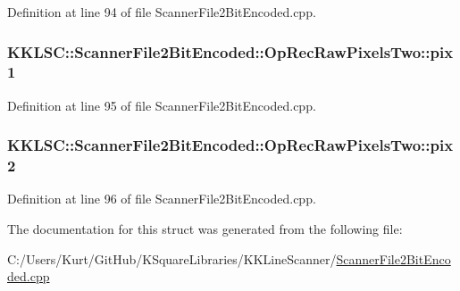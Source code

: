 Definition at line 94 of file Scanner\+File2\+Bit\+Encoded.\+cpp.

\subsubsection[{\texorpdfstring{pix1}{pix1}}]{ K\+K\+L\+S\+C\+::\+Scanner\+File2\+Bit\+Encoded\+::\+Op\+Rec\+Raw\+Pixels\+Two\+::pix1}\hypertarget{struct_scanner_file2_bit_encoded_1_1_op_rec_raw_pixels_two_a7f94fe7299b496e66520797259a9269a}{}\label{struct_scanner_file2_bit_encoded_1_1_op_rec_raw_pixels_two_a7f94fe7299b496e66520797259a9269a}


Definition at line 95 of file Scanner\+File2\+Bit\+Encoded.\+cpp.

\subsubsection[{\texorpdfstring{pix2}{pix2}}]{ K\+K\+L\+S\+C\+::\+Scanner\+File2\+Bit\+Encoded\+::\+Op\+Rec\+Raw\+Pixels\+Two\+::pix2}\hypertarget{struct_scanner_file2_bit_encoded_1_1_op_rec_raw_pixels_two_abbe00413774e5dcefeab2a279930d5c2}{}\label{struct_scanner_file2_bit_encoded_1_1_op_rec_raw_pixels_two_abbe00413774e5dcefeab2a279930d5c2}


Definition at line 96 of file Scanner\+File2\+Bit\+Encoded.\+cpp.



The documentation for this struct was generated from the following file\+:\begin{DoxyCompactItemize}
\item 
C\+:/\+Users/\+Kurt/\+Git\+Hub/\+K\+Square\+Libraries/\+K\+K\+Line\+Scanner/\hyperlink{_scanner_file2_bit_encoded_8cpp}{Scanner\+File2\+Bit\+Encoded.\+cpp}\end{DoxyCompactItemize}
